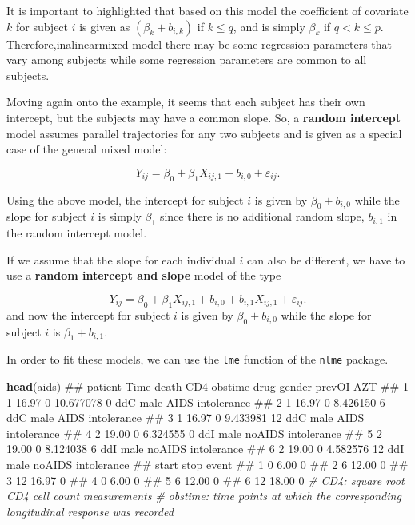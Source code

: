 \documentclass[]{book}
\makeatletter
\newenvironment{Shaded}{\begin{snugshade}}{\end{snugshade}}
\newcommand{\KeywordTok}[1]{\textcolor[rgb]{0.13,0.29,0.53}{\textbf{#1}}}
\newcommand{\CommentTok}[1]{\textcolor[rgb]{0.56,0.35,0.01}{\textit{#1}}}
\newcommand{\NormalTok}[1]{#1}
\newenvironment{kframe}{%
\medskip{}
\setlength{\fboxsep}{.8em}
 \def\at@end@of@kframe{}%
 \ifinner\ifhmode%
  \def\at@end@of@kframe{\end{minipage}}%
  \begin{minipage}{\columnwidth}%
 \fi\fi%
 \def\FrameCommand##1{\hskip\@totalleftmargin \hskip-\fboxsep
 \colorbox{shadecolor}{##1}\hskip-\fboxsep
     \hskip-\linewidth \hskip-\@totalleftmargin \hskip\columnwidth}%
 \MakeFramed {\advance\hsize-\width
   \@totalleftmargin\z@ \linewidth\hsize
   \@setminipage}}%
 {\par\unskip\endMakeFramed%
 \at@end@of@kframe}
\renewenvironment{Shaded}{\begin{kframe}}{\end{kframe}}
\theoremstyle{definition}
\theoremstyle{definition}
\theoremstyle{definition}
\theoremstyle{remark}
\let\BeginKnitrBlock\begin \let\EndKnitrBlock\end
\makeatother
\begin{document}
\BeginKnitrBlock{rmdhint_sestelo}
It is important to highlighted that based on this model the coefficient
of covariate \(k\) for subject \(i\) is given as \((\beta_k + b_{i,k})\)
if \(k \le q\), and is simply \(\beta_k\) if \(q < k \le p\).
Therefore,inalinearmixed model there may be some regression parameters
that vary among subjects while some regression parameters are common to
all subjects.
\EndKnitrBlock{rmdhint_sestelo}

Moving again onto the example, it seems that each subject has their own
intercept, but the subjects may have a common slope. So, a
\textbf{random intercept} model assumes parallel trajectories for any
two subjects and is given as a special case of the general mixed model:

\[
Y_{ij} = \beta_0 + \beta_1 X_{ij,1} + b_{i,0} + \varepsilon_{ij}.
\]

Using the above model, the intercept for subject \(i\) is given by
\(\beta_0 + b_{i,0}\) while the slope for subject \(i\) is simply
\(\beta_1\) since there is no additional random slope, \(b_{i,1}\) in
the random intercept model.

If we assume that the slope for each individual \(i\) can also be
different, we have to use a \textbf{random intercept and slope} model of
the type

\[
Y_{ij} = \beta_0 + \beta_1 X_{ij,1} + b_{i,0} + b_{i,1} X_{ij,1}+ \varepsilon_{ij}.
\] and now the intercept for subject \(i\) is given by
\(\beta_0 + b_{i,0}\) while the slope for subject \(i\) is
\(\beta_1 + b_{i, 1}\).

In order to fit these models, we can use the \texttt{lme} function of
the \texttt{nlme} package.

\begin{Shaded}
\begin{Highlighting}[]
\KeywordTok{head}\NormalTok{(aids) }
\NormalTok{##   patient  Time death       CD4 obstime drug gender prevOI         AZT}
\NormalTok{## 1       1 16.97     0 10.677078       0  ddC   male   AIDS intolerance}
\NormalTok{## 2       1 16.97     0  8.426150       6  ddC   male   AIDS intolerance}
\NormalTok{## 3       1 16.97     0  9.433981      12  ddC   male   AIDS intolerance}
\NormalTok{## 4       2 19.00     0  6.324555       0  ddI   male noAIDS intolerance}
\NormalTok{## 5       2 19.00     0  8.124038       6  ddI   male noAIDS intolerance}
\NormalTok{## 6       2 19.00     0  4.582576      12  ddI   male noAIDS intolerance}
\NormalTok{##   start  stop event}
\NormalTok{## 1     0  6.00     0}
\NormalTok{## 2     6 12.00     0}
\NormalTok{## 3    12 16.97     0}
\NormalTok{## 4     0  6.00     0}
\NormalTok{## 5     6 12.00     0}
\NormalTok{## 6    12 18.00     0}
\CommentTok{# CD4: square root CD4 cell count measurements}
\CommentTok{# obstime: time points at which the corresponding longitudinal response was recorded}
\end{Highlighting}
\end{Shaded}
\end{document}
